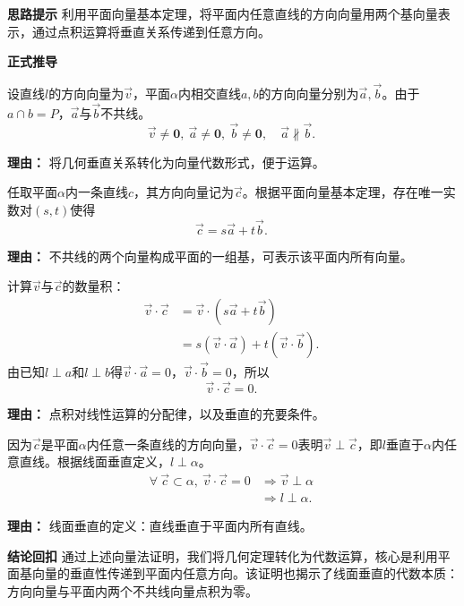 \begin{proofbox}
	\textbf{\textcolor{CProof}{思路提示}}
	利用平面向量基本定理，将平面内任意直线的方向向量用两个基向量表示，通过点积运算将垂直关系传递到任意方向。

	\medskip
	\textbf{\textcolor{CProof}{正式推导}}
	\begin{description}[style=nextline, leftmargin=2.8em, labelsep=0.5em, itemsep=0.55em]
		\item[\textbf{步骤一（设定方向向量）：}]
			设直线$l$的方向向量为$\vec{v}$，平面$\alpha$内相交直线$a,b$的方向向量分别为$\vec{a},\vec{b}$。由于$a\cap b=P$，$\vec{a}$与$\vec{b}$不共线。\
			\[
				\vec{v}\neq\mathbf{0},\ \vec{a}\neq\mathbf{0},\ \vec{b}\neq\mathbf{0},\quad \vec{a}\not\parallel\vec{b}.\
			\]
			\par\textbf{理由：} 将几何垂直关系转化为向量代数形式，便于运算。
		\item[\textbf{步骤二（表示任意方向向量）：}]
			任取平面$\alpha$内一条直线$c$，其方向向量记为$\vec{c}$。根据平面向量基本定理，存在唯一实数对$(s,t)$使得\
			\[
				\vec{c}=s\vec{a}+t\vec{b}.\
			\]
			\par\textbf{理由：} 不共线的两个向量构成平面的一组基，可表示该平面内所有向量。
		\item[\textbf{步骤三（计算点积）：}]
			计算$\vec{v}$与$\vec{c}$的数量积：\
			\[
				\begin{aligned}
					\vec{v}\cdot\vec{c} &= \vec{v}\cdot(s\vec{a}+t\vec{b}) \\&= s(\vec{v}\cdot\vec{a}) + t(\vec{v}\cdot\vec{b}).
			\end{aligned}
				\
			\]
			由已知$l\perp a$和$l\perp b$得$\vec{v}\cdot\vec{a}=0$，$\vec{v}\cdot\vec{b}=0$，所以\
			\[
				\vec{v}\cdot\vec{c}=0.\
			\]
			\par\textbf{理由：} 点积对线性运算的分配律，以及垂直的充要条件。
		\item[\textbf{步骤四（推导线面垂直）：}]
			因为$\vec{c}$是平面$\alpha$内任意一条直线的方向向量，$\vec{v}\cdot\vec{c}=0$表明$\vec{v}\perp\vec{c}$，即$l$垂直于$\alpha$内任意直线。根据线面垂直定义，$l\perp\alpha$。\
			\[
				\begin{aligned}
					\forall\ \vec{c}\subset\alpha,\ \vec{v}\cdot\vec{c}=0 &\Rightarrow \vec{v}\perp\alpha \\&\Rightarrow l\perp\alpha.
			\end{aligned}
				\
			\]
			\par\textbf{理由：} 线面垂直的定义：直线垂直于平面内所有直线。
	\end{description}

	\medskip
	\textbf{\textcolor{CProof}{结论回扣}}
	通过上述向量法证明，我们将几何定理转化为代数运算，核心是利用平面基向量的垂直性传递到平面内任意方向。该证明也揭示了线面垂直的代数本质：方向向量与平面内两个不共线向量点积为零。
\end{proofbox}
